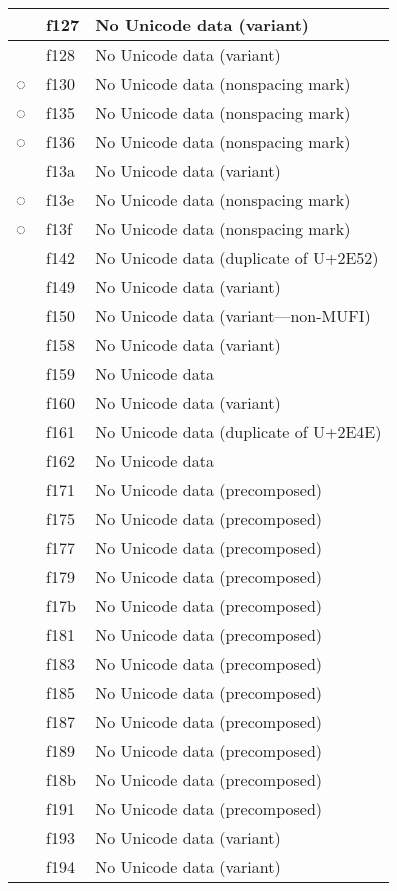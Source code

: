 \documentclass[12pt,letterpaper,openany]{book}
\begin{document}
\begin{center}
\begin{supertabular}{|m{0.25in}|m{0.5in}|m{4in}|}
 & f127 & No Unicode data (variant)\\\hline
 & f128 & No Unicode data (variant)\\\hline
◌ & f130 & No Unicode data (nonspacing mark)\\\hline
◌ & f135 & No Unicode data (nonspacing mark)\\\hline
◌ & f136 & No Unicode data (nonspacing mark)\\\hline
 & f13a & No Unicode data (variant)\\\hline
◌ & f13e & No Unicode data (nonspacing mark)\\\hline
◌ & f13f & No Unicode data (nonspacing mark)\\\hline
 & f142 & No Unicode data (duplicate of U+2E52)\\\hline
 & f149 & No Unicode data (variant)\\\hline
 & f150 & No Unicode data (variant---non-MUFI)\\\hline
 & f158 & No Unicode data (variant)\\\hline
 & f159 & No Unicode data\\\hline
 & f160 & No Unicode data (variant)\\\hline
 & f161 & No Unicode data (duplicate of U+2E4E)\\\hline
 & f162 & No Unicode data\\\hline
 & f171 & No Unicode data (precomposed)\\\hline
 & f175 & No Unicode data (precomposed)\\\hline
 & f177 & No Unicode data (precomposed)\\\hline
 & f179 & No Unicode data (precomposed)\\\hline
 & f17b & No Unicode data (precomposed)\\\hline
 & f181 & No Unicode data (precomposed)\\\hline
 & f183 & No Unicode data (precomposed)\\\hline
 & f185 & No Unicode data (precomposed)\\\hline
 & f187 & No Unicode data (precomposed)\\\hline
 & f189 & No Unicode data (precomposed)\\\hline
 & f18b & No Unicode data (precomposed)\\\hline
 & f191 & No Unicode data (precomposed)\\\hline
 & f193 & No Unicode data (variant)\\\hline
 & f194 & No Unicode data (variant)\\\hline

\end{supertabular}
\end{center}
\end{document}
